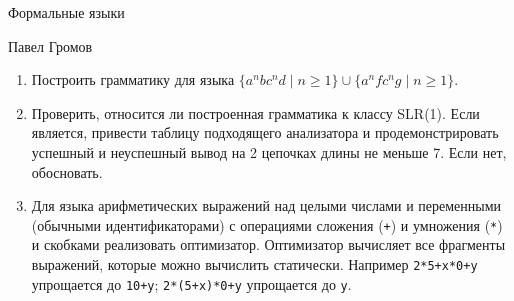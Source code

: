 \documentclass[12pt]{article}
\begin{document}
\begin{center}
{\LARGE Формальные языки}

\bigskip

{\Large Павел Громов}
\end{center} 

\bigskip

\begin{enumerate}
  \item Построить грамматику для языка $\{ a^n b c^n d \mid n \geq 1 \} \cup \{ a^n f c^n g \mid n \geq 1 \}$.
  \item Проверить, относится ли построенная грамматика к классу SLR(1). Если является, привести таблицу подходящего анализатора и продемонстрировать успешный и неуспешный вывод на 2 цепочках длины не меньше 7. Если нет, обосновать.
  \item Для языка арифметических выражений над целыми числами и переменными (обычными идентификаторами) с операциями сложения (\verb!+!) и умножения (\verb!*!) и скобками реализовать оптимизатор. Оптимизатор вычисляет все фрагменты выражений, которые можно вычислить статически. 
  Например \verb!2*5+x*0+y! упрощается до \verb!10+y!; \verb!2*(5+x)*0+y! упрощается до \verb!y!. 
  
\end{enumerate}
\end{document}
